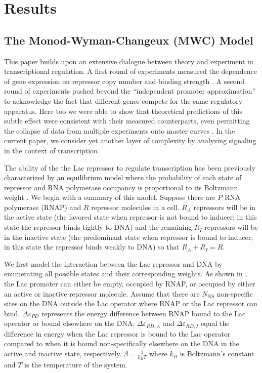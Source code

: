 \pagebreak
\section*{Results}

\subsection*{The Monod-Wyman-Changeux (MWC) Model } 

This paper builds upon an extensive dialogue between theory and experiment in
transcriptional regulation. A first round of experiments measured the dependence
of gene expression on repressor copy number and binding strength
\cite{Garcia2011}. A second round of experiments pushed beyond the ``independent
promoter approximation'' to acknowledge the fact that different genes compete
for the same regulatory apparatus. Here too we were able to show that
theoretical predictions of this subtle effect were consistent with their
measured counterparts, even permitting the collapse of data from multiple
experiments onto master curves \cite{Brewster2014, Weinert2014}. In the current
paper, we consider yet another layer of complexity by analyzing signaling in the
context of transcription.

The ability of the the Lac repressor
to regulate transcription has been previously characterized by an equilibrium
model where the probability of each state of repressor and RNA polymerase
occupancy is proportional to its Boltzmann weight \cite{Daber2011a,
	Phillips2015a}. We begin with a summary of this model. Suppose there are \(P\)
RNA polymerase (RNAP) and \(R\) repressor molecules in a cell. \(R_A\)
repressors will be in the active state (the favored state when repressor is not
bound to inducer; in this state the repressor binds tightly to DNA) and the
remaining \(R_I\) repressors will be in the inactive state (the predominant
state when repressor is bound to inducer; in this state the repressor binds
weakly to DNA) so that \(R_A+R_I=R\).

We first model the interaction between the Lac repressor and DNA by enumerating
all possible states and their corresponding weights. As shown in
\fref[figpolymeraseRepressorStates], the Lac promoter can either be empty,
occupied by RNAP, or occupied by either an active or inactive repressor
molecule. Assume that there are $N_{\text{NS}}$ non-specific sites on the DNA outside
the Lac operator where RNAP or the Lac repressor can bind. \(\Delta\varepsilon_{PD}\)
represents the energy difference between RNAP bound to the Lac operator or bound
elsewhere on the DNA; \(\Delta\varepsilon_{RD,A}\) and \(\Delta\varepsilon_{RD,I}\) equal the
difference in energy when the Lac repressor is bound to the Lac operator
compared to when it is bound non-specifically elsewhere on the DNA in the active
and inactive state, respectively. $\beta = \frac{1}{k_BT}$ where $k_B$ is
Boltzmann's constant and $T$ is the temperature of the system.

